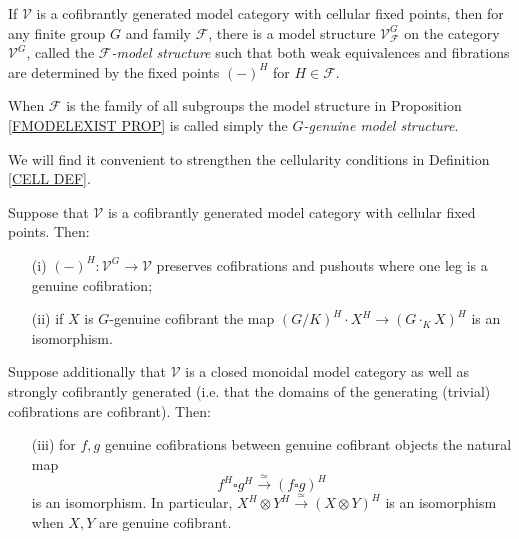 \documentclass[a4paper,10pt]{article}%
\begin{document}
\begin{proposition}\label{FMODELEXIST PROP}
	If $\mathcal{V}$ is a cofibrantly generated model category with cellular fixed points, then for any finite group $G$ and family $\mathcal{F}$, there is a model structure $\mathcal{V}^G_{\mathcal{F}}$ on the category 
	$\mathcal{V}^G$, called the 
	\emph{$\mathcal{F}$-model structure}
	such that both weak equivalences and fibrations are determined by the fixed points $(\minus)^H$ for 
	$H \in \mathcal{F}$.
\end{proposition}

When $\mathcal{F}$ is the family of all subgroups the model structure in Proposition \ref{FMODELEXIST PROP} is called simply the \textit{$G$-genuine model structure}.

We will find it convenient to strengthen the cellularity conditions in Definition \ref{CELL DEF}.


\begin{proposition}\label{STRONGCELL PROP}
	Suppose that $\mathcal{V}$ is a cofibrantly generated model category with cellular fixed points. Then:
	\begin{itemize}
		\item[(i)] $(\minus)^H \colon \mathcal{V}^G \to \mathcal{V}$ preserves cofibrations and pushouts where one leg
			 is a genuine cofibration;
		\item[(ii)] if $X$ is $G$-genuine cofibrant the map 
			$(G/K)^H \cdot X^H \to (G \cdot_K X)^H$ is an isomorphism.
	\end{itemize}
Suppose additionally that $\mathcal{V}$ is a 
closed monoidal model category
as well as strongly cofibrantly generated
(i.e. that the domains of the generating (trivial) cofibrations are cofibrant). Then:
	\begin{itemize}
		\item[(iii)] for $f,g$ genuine cofibrations between genuine cofibrant objects the natural map 
\[f^H \square g^H \xrightarrow{\simeq} (f \square g)^H\]
 is an isomorphism.
 In particular, $X^H \otimes Y^H \xrightarrow{\simeq} 
 (X \otimes Y)^H$ is an isomorphism when $X,Y$ are genuine cofibrant.
	\end{itemize}
\end{proposition}
\end{document}
